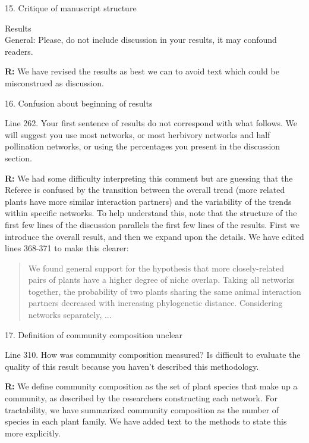 \documentclass[12pt]{letter}
\newenvironment{refquote}{\bigskip \begin{it}}{\end{it}\smallskip}
\begin{document}
	15. Critique of manuscript structure 

		\begin{refquote}
			Results\\
			General: Please, do not include discussion in your results, it may confound readers.
		\end{refquote}

		\textbf{R:} We have revised the results as best we can to avoid text which could be misconstrued as discussion.


	16. Confusion about beginning of results

		\begin{refquote}
			Line 262. Your first sentence of results do not correspond with what follows. We will suggest you use most networks, or most herbivory networks and half pollination networks, or using the percentages you present in the discussion section.
		\end{refquote}

		\textbf{R:} We had some difficulty interpreting this comment but are guessing that the Referee is confused by the transition between the overall trend (more related plants have more similar interaction partners) and the variability of the trends within specific networks. To help understand this, note that the structure of the first few lines of the discussion parallels the first few lines of the results. First we introduce the overall result, and then we expand upon the details. We have edited lines 368-371 to make this clearer:

		\begin{quotation}

			We found general support for the hypothesis that more
			closely-related pairs of plants have a higher degree
			of niche overlap. Taking all networks together, 
			the probability of two plants sharing the same animal 
			interaction partners decreased with increasing 
			phylogenetic distance. Considering networks separately, ...

		\end{quotation}


	17. Definition of community composition unclear


		\begin{refquote}
			Line 310. How was community composition measured? Is difficult to evaluate the quality of this result because you haven't described this methodology.
		\end{refquote}


		\textbf{R:} We define community composition as the set of plant species that make up a community, as described by the researchers constructing each network. For tractability, we have summarized community composition as the number of species in each plant family. We have added text to the methods to state this more explicitly.
\end{document}
